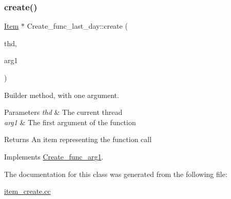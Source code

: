 \subsubsection{\texorpdfstring{create()}{create()}}
{\footnotesize\ttfamily \mbox{\hyperlink{classItem}{Item}} $\ast$ Create\+\_\+func\+\_\+last\+\_\+day\+::create (\begin{DoxyParamCaption}\item[{T\+HD $\ast$}]{thd,  }\item[{\mbox{\hyperlink{classItem}{Item}} $\ast$}]{arg1 }\end{DoxyParamCaption})\hspace{0.3cm}{\ttfamily [virtual]}}

Builder method, with one argument. 
\begin{DoxyParams}{Parameters}
{\em thd} & The current thread \\
\hline
{\em arg1} & The first argument of the function \\
\hline
\end{DoxyParams}
\begin{DoxyReturn}{Returns}
An item representing the function call 
\end{DoxyReturn}


Implements \mbox{\hyperlink{classCreate__func__arg1_a3e9a98f755cd82c3e762e334c955a8c9}{Create\+\_\+func\+\_\+arg1}}.



The documentation for this class was generated from the following file\+:\begin{DoxyCompactItemize}
\item 
\mbox{\hyperlink{item__create_8cc}{item\+\_\+create.\+cc}}\end{DoxyCompactItemize}
